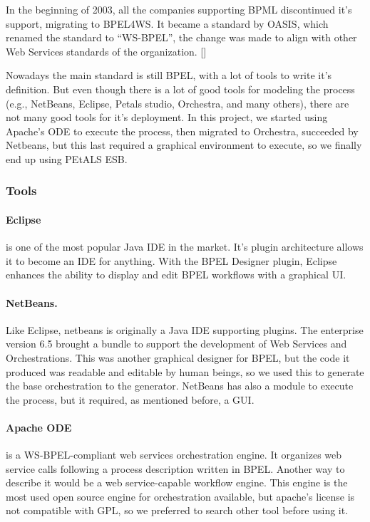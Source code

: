 In the beginning of 2003, all the companies supporting BPML discontinued it's support, migrating to BPEL4WS. It became a standard by OASIS, which renamed the standard to ``WS-BPEL'', the change was made to align with other Web Services standards of the organization. [\citet{OASIS}]

Nowadays the main standard is still BPEL, with a lot of tools to write it's definition. But even though there is a lot of good tools for modeling the process (e.g., NetBeans, Eclipse, Petals studio, Orchestra, and many others), there are not many good tools for it's deployment. In this project, we started using Apache's ODE to execute the process, then migrated to Orchestra, succeeded by Netbeans, but this last required a graphical environment to execute, so we finally end up using PEtALS ESB. 

\subsubsection{Tools}

\paragraph{Eclipse}
is one of the most popular Java IDE in the market. It's plugin architecture allows it to become an IDE for anything. With the BPEL Designer plugin, Eclipse enhances the ability to display and edit BPEL workflows with a graphical UI.

\paragraph{NetBeans.}
Like Eclipse, netbeans is originally a Java IDE supporting plugins. The enterprise version 6.5 brought a bundle to support the development of Web Services and Orchestrations. This was another graphical designer for BPEL, but the code it produced was readable and editable by human beings, so we used this to generate the base orchestration to the generator. NetBeans has also a module to execute the process, but it required, as mentioned before, a GUI.

\paragraph{Apache ODE}
is a WS-BPEL-compliant web services orchestration engine. It organizes web service calls following a process description written in BPEL. Another way to describe it would be a web service-capable workflow engine. This engine is the most used open source engine for orchestration available, but apache's license is not compatible with GPL, so we preferred to search other tool before using it.

